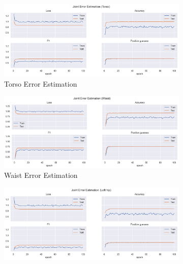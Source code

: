   \begin{figure}[!ht]
    \centering
    \begin{subfigure}[b]{0.47\linewidth}
        \centering
        \includegraphics[width=\textwidth]{figures/Results/v2_bs_40_is_64_e_100/jt/Torso_ErrorEstimation.png}
        \caption{Torso Error Estimation}
        \label{fig:v2_torso_jt_ee}
    \end{subfigure}
    \hfill
    \begin{subfigure}[b]{0.47\linewidth}
      \centering
      \includegraphics[width=\textwidth]{figures/Results/v2_bs_40_is_64_e_100/jt/Waist_ErrorEstimation.png}
      \caption{Waist Error Estimation}
      \label{fig:v2_waist_jt_ee}
    \end{subfigure}
    \hfill
    \begin{subfigure}[b]{0.47\linewidth}
        \centering
        \includegraphics[width=\textwidth]{figures/Results/v2_bs_40_is_64_e_100/jt/Left hip_ErrorEstimation.png}

\end{subfigure}
\end{figure}
